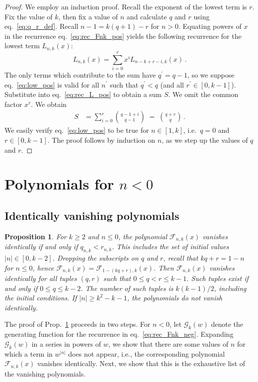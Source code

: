 \documentclass[review]{elsarticle}
\theoremstyle{plain}
\newtheorem{proposition}[theorem]{Proposition}
\begin{document}
\begin{proof}
We employ an induction proof.
Recall the exponent of the lowest term is $r$.
Fix the value of $k$, then fix a value of $n$ and calculate $q$ and $r$ using eq.~\eqref{eq:q_r_def}.
Recall $n-1 = k(q+1)-r$ for $n>0$.
Equating powers of $x$ in the recurrence eq.~\eqref{eq:rec_Fnk_pos}
yields the following recurrence for the lowest term $L_{n,k}(x)$:
\begin{equation}  
\label{eq:rec_L_pos}
  L_{n,k}(x) = \sum_{i=0}^r x^i L_{n-k+r-i,k}(x) \,.
\end{equation}
The only terms which contribute to the sum have $q^\prime=q-1$,
so we suppose eq.~\eqref{eq:low_pos} is valid for all $n^\prime$ such that $q^\prime < q$ (and all $r^\prime \in[0,k-1]$).
Substitute into eq.~\eqref{eq:rec_L_pos} to obtain a sum $S$. We omit the common factor $x^r$. We obtain 
\begin{equation}  
\begin{split}
S &= \sum_{i=0}^{r} \binom{q-1+i}{q-1}
\;=\; \binom{q+r}{q} \,.
\end{split}  
\end{equation}
We easily verify eq.~\eqref{eq:low_pos} to be true for $n\in[1,k]$, i.e.~$q=0$ and $r\in[0,k-1]$.
The proof follows by induction on $n$, as we step up the values of $q$ and $r$.
\end{proof}

\setcounter{equation}{0}
\section{Polynomials for $n<0$}\label{sec:poly_neg}
\subsection{Identically vanishing polynomials}\label{sec:poly_van}
\begin{proposition}\label{prop:van_indices}
For $k\ge2$ and $n\le0$, the polynomial $\mathcal{F}_{n,k}(x)$ vanishes identically if and only if $q_{n,k}<r_{n,k}$.
This includes the set of initial values $|n|\in[0,k-2]$.
Dropping the subscripts on $q$ and $r$,
recall that $kq+r = 1-n$ for $n\le0$, hence $\mathcal{F}_{n,k}(x) = \mathcal{F}_{1 -(kq+r),k}(x)$.
Then $\mathcal{F}_{n,k}(x)$ vanishes identically for all tuples $(q,r)$ such that
$0 \le q < r \le k-1$.
Such tuples exist if and only if $0 \le q \le k-2$.
The number of such tuples is $k(k-1)/2$, including the initial conditions.
If $|n|\ge k^2-k-1$, the polynomials do not vanish identically.
\end{proposition}
The proof of Prop.~\ref{prop:van_indices} proceeds in two steps.
For $n<0$, let $\mathcal{G}_k(w)$ denote the generating function for the recurrence in eq.~\eqref{eq:rec_Fnk_neg}.
Expanding $\mathcal{G}_k(w)$ in a series in powers of $w$, we show that there are some values of $n$ 
for which a term in $w^{|n|}$ does not appear, i.e., the corresponding polynomial $\mathcal{F}_{n,k}(x)$ vanishes identically.
Next, we show that this is the exhaustive list of the vanishing polynomials.
\end{document}
